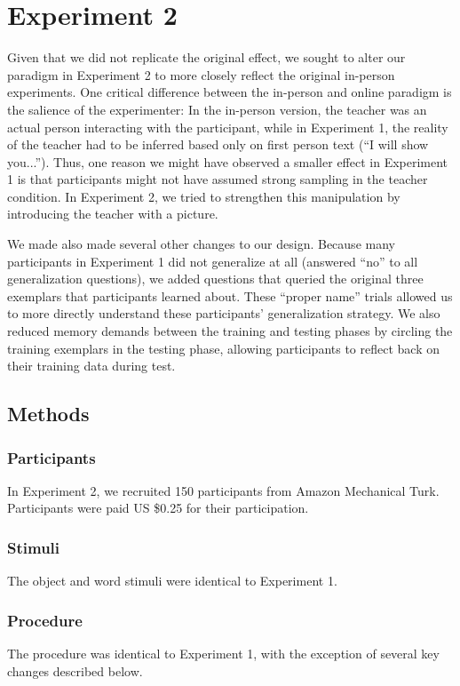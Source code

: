 \documentclass[man]{apa2}
\begin{document}
\section{Experiment 2}

Given that we did not replicate the original effect, we sought to alter our paradigm in Experiment 2 to more closely reflect the original in-person experiments. One critical difference between the in-person and online paradigm is the salience of the experimenter: In the in-person version, the teacher was an actual person interacting with the participant, while in Experiment 1, the reality of the teacher had to be inferred based only on first person text (``I will show you...''). Thus, one reason we might have observed a smaller effect in Experiment 1 is that participants might not have assumed strong sampling in the teacher condition. In Experiment 2, we tried to strengthen this manipulation by introducing the teacher with a picture.

We made also made several other changes to our design. Because many participants in Experiment 1 did not generalize at all (answered ``no'' to all generalization questions), we added questions that queried the original three exemplars that participants learned about. These ``proper name'' trials allowed us to more directly understand these participants' generalization strategy. We also reduced memory demands between the training and testing phases by circling the training exemplars in the testing phase, allowing participants to reflect back on their training data during test.

\subsection{Methods}

\subsubsection{Participants} In Experiment 2, we recruited 150 participants from Amazon Mechanical Turk. Participants were paid US \$0.25 for their participation.

\subsubsection{Stimuli}
The object and word stimuli were identical to Experiment 1.

\subsubsection{Procedure}
The procedure was identical to Experiment 1, with the exception of several key changes described below.
\end{document}
